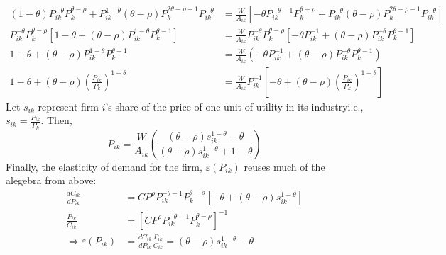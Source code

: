 \documentclass{article}
\begin{document}
{\small \begin{align*}
	(1-\theta)P_{ik}^{-\theta}P_k^{\theta-\rho} + P_{ik}^{1-\theta}(\theta-\rho)P_k^{2\theta-\rho-1}P_{ik}^{-\theta}
		&= \frac{W}{A_{ik}}\left[-\theta P_{ik}^{-\theta-1}P_k^{\theta-\rho} + P_{ik}^{-\theta}(\theta-\rho)P_k^{2\theta-\rho-1}P_{ik}^{-\theta}\right]			\\
	P_{ik}^{-\theta}P_k^{\theta-\rho}\left[1-\theta + (\theta-\rho)P_{ik}^{1-\theta}P_k^{\theta-1}\right] 
		&= \frac{W}{A_{ik}}P_{ik}^{-\theta}P_k^{\theta-\rho}\left[-\theta P_{ik}^{-1} + (\theta-\rho)P_{ik}^{-\theta}P_k^{\theta-1}\right] 						\\
	1-\theta + (\theta-\rho)P_{ik}^{1-\theta}P_k^{\theta-1} &= \frac{W}{A_{ik}}\left(-\theta P_{ik}^{-1} + (\theta-\rho)P_{ik}^{-\theta}P_k^{\theta-1}\right)	\\
	1-\theta + (\theta-\rho)\left(\frac{P_{ik}}{P_k}\right)^{1-\theta} &= \frac{W}{A_{ik}}P_{ik}^{-1}\left[-\theta + (\theta-\rho)\left(\frac{P_{ik}}{P_k}\right)^{1-\theta}\right]
\end{align*} }
Let $s_{ik}$ represent firm $i$'s share of the price of one unit of utility in its industry\textemdash i.e., ${s_{ik} = \frac{P_{ik}}{P_k}}$. Then,
\[
	P_{ik} = \frac{W}{A_{ik}}\left(\frac{(\theta-\rho)s_{ik}^{1-\theta} - \theta}{(\theta-\rho)s_{ik}^{1-\theta} + 1-\theta}\right)
\]
Finally, the elasticity of demand for the firm, $\varepsilon(P_{ik})$ reuses much of the alegebra from above:
\begin{align*}
	\frac{dC_{ik}}{dP_{ik}}			&= CP^\rho P_{ik}^{-\theta-1}P_k^{\theta-\rho}\left[-\theta + (\theta-\rho)s_{ik}^{1-\theta}\right]		\\
	\frac{P_{ik}}{C_{ik}}			&= \left[CP^\rho P_{ik}^{-\theta-1}P_k^{\theta-\rho}\right]^{-1}										\\
	\Rightarrow \varepsilon(P_{ik})	&= \frac{dC_{ik}}{dP_{ik}}\frac{P_{ik}}{C_{ik}} = (\theta-\rho)s_{ik}^{1-\theta} - \theta
\end{align*}

\pagebreak
\end{document}
